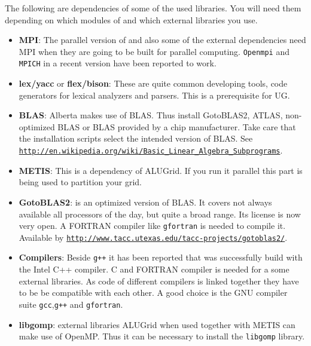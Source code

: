 The following are dependencies of some of the used libraries. You will need them depending on which modules of \Dune and which external libraries you use.
\begin{itemize}
\item \textbf{MPI}: The parallel version of \Dune and also some of the external dependencies need MPI when they are going to be built for parallel computing. \texttt{Openmpi} and \texttt{MPICH} in a recent version have been reported to work. 

\item \textbf{lex/yacc} or \textbf{flex/bison}: These are quite common developing tools, code generators for lexical analyzers and parsers. This is a prerequisite for UG.

\item \textbf{BLAS}: Alberta makes use of BLAS. Thus install GotoBLAS2, ATLAS, non-optimized BLAS or BLAS provided by a chip manufacturer. Take care that the installation scripts select the intended version of BLAS. See \texttt{\url{http://en.wikipedia.org/wiki/Basic_Linear_Algebra_Subprograms}}.

\item \textbf{METIS}: This is a dependency of ALUGrid. If you run it parallel this part is being used to partition your grid.

\item \textbf{GotoBLAS2}: is an optimized version of BLAS. It covers not always available all processors of the day, but quite a broad range. Its license is now very open.  A FORTRAN compiler like \texttt{gfortran} is needed to compile it.\\
Available by \texttt{\url{http://www.tacc.utexas.edu/tacc-projects/gotoblas2/}}.

\item \textbf{Compilers}: Beside \texttt{g++} it has been reported that \Dune was successfully build with the Intel C++ compiler. 
C and FORTRAN compiler is needed for a some external libraries. As code of different compilers is linked together they have to be be compatible with each other. A good choice is the GNU compiler suite \texttt{gcc},\texttt{g++} and \texttt{gfortran}.

\item \textbf{libgomp}: external libraries ALUGrid when used together with METIS can make use of OpenMP. Thus it can be necessary to install the \texttt{libgomp} library.

\end{itemize}

